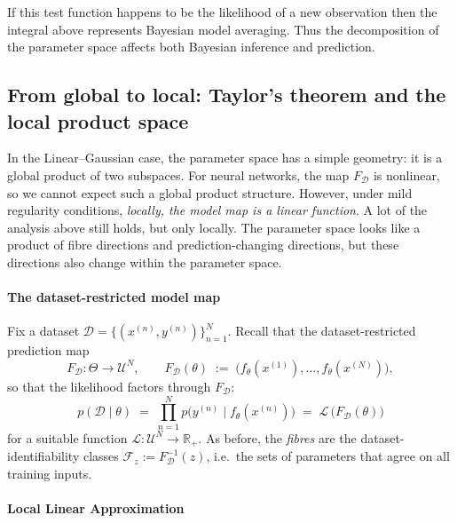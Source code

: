 If this test function happens to be the likelihood of a new observation then the integral above represents Bayesian model averaging. Thus the decomposition of the parameter space affects both Bayesian inference and prediction.
\subsection{From global to local: Taylor's theorem and the local product space}
\label{subsec:local_linearization_product}

In the Linear--Gaussian case, the parameter space has a simple geometry: it is a global product of two subspaces. For neural networks, the map $F_{\mathcal{D}}$ is nonlinear, so we cannot expect such a global product structure. However, under mild regularity conditions, \emph{locally, the model map is a linear function}. A lot of the analysis above still holds, but only locally. The parameter space looks like a product of fibre directions and prediction-changing directions, but these directions also change within the parameter space.

\paragraph{The dataset-restricted model map}
Fix a dataset \(\mathcal D=\{(x^{(n)},y^{(n)})\}_{n=1}^N\).
Recall that the dataset-restricted prediction map
\begin{equation}
  F_{\mathcal D}:\Theta\to\mathcal U^N,
  \qquad
  F_{\mathcal D}(\theta)
  \;:=\;
  \bigl(f_\theta(x^{(1)}),\dots,f_\theta(x^{(N)})\bigr),
  \label{eq:dataset_restricted_map_local}
\end{equation}
so that the likelihood factors through \(F_{\mathcal D}\):
\[
  p(\mathcal D\mid \theta)
  \;=\;
  \prod_{n=1}^N p\bigl(y^{(n)}\mid f_\theta(x^{(n)})\bigr)
  \;=\;
  \mathcal{L}\,\bigl(F_{\mathcal D}(\theta)\bigr)
\]
for a suitable function \(\mathcal{L}:\mathcal U^N\to\mathbb{R}_+\).
As before, the \emph{fibres} are the dataset-identifiability classes
\(
\mathcal F_z := F_{\mathcal D}^{-1}(z)
\),
i.e.\ the sets of parameters that agree on all training inputs.

\paragraph{Local Linear Approximation}

